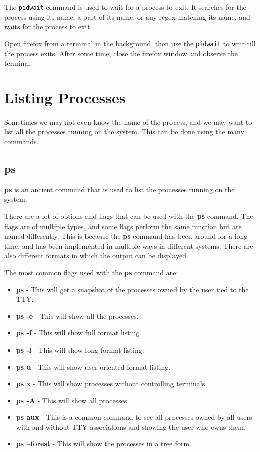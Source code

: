 The \texttt{pidwait} command is used to wait for a process to exit.
It searches for the process using its name, a part of its name, or any
regex matching its name, and waits for the process to exit.

\begin{exercise}
  Open firefox from a terminal in the background, then use the \texttt{pidwait}
  to wait till the process exits. After some time, close the firefox window
  and observe the terminal.
\end{exercise}

\vfill
\pagebreak
\section{Listing Processes}

Sometimes we may not even know the name of the process, and we may want to
list all the processes running on the system. This can be done using the
many commands.

\subsection{ps}

\textbf{ps} is an ancient command
that is used to list the processes running on the system.

There are a lot of options and flags that can be used with the \textbf{ps} command.
The flags are of multiple types, and some flags perform the same function but
are named differently. This is because the \textbf{ps} command has been around
for a long time, and has been implemented in multiple ways in different systems.
There are also different formats in which the output can be displayed.

The most common flags used with the \textbf{ps} command are:

\begin{itemize}
  \item \textbf{ps} - This will get a snapshot of the processes owned by the user tied to the TTY.
  \item \textbf{ps -e} - This will show all the processes.
  \item \textbf{ps -f} - This will show full format listing.
  \item \textbf{ps -l} - This will show long format listing.
  \item \textbf{ps u} - This will show user-oriented format listing.
  \item \textbf{ps x} - This will show processes without controlling terminals.
  \item \textbf{ps -A} - This will show all processes.
  \item \textbf{ps aux} - This is a common command to see all processes owned by all users with and without TTY associations and showing the user who owns them.
  \item \textbf{ps --forest} - This will show the processes in a tree form.
\end{itemize}

